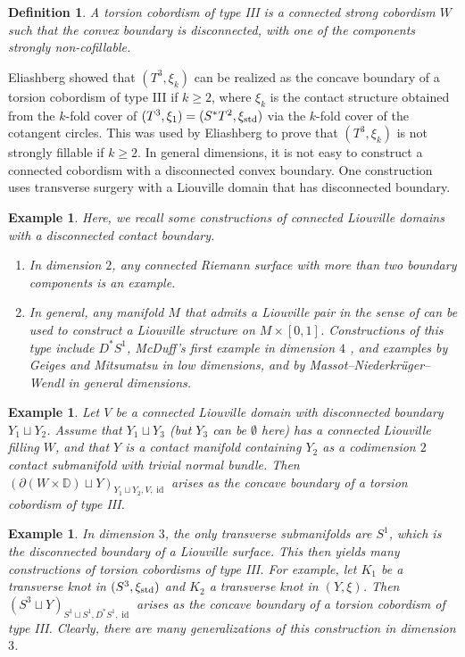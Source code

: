 \documentclass[11pt]{amsart}
\numberwithin{equation}{section}
\newtheorem{definition}[theorem]{\textbf{Definition}}
\newtheorem{example}[theorem]{\textbf{Example}}
\def\D{{\mathbb D}}
\def\std{\rm std}
\DeclareMathOperator{\Id}{id}
\begin{document}
\begin{definition}\label{def:torsion_III}
A torsion cobordism of type III is a \emph{connected} strong cobordism $W$ such that the convex boundary is disconnected, with one of the components strongly non-cofillable.   
\end{definition}
Eliashberg \cite{Eli96} showed that $(T^3,\xi_k)$ can be realized as the concave boundary of a torsion cobordism of type III if $k\ge 2$, where $\xi_k$ is the contact structure obtained from the $k$-fold cover of $(T^3,\xi_1)=(S^*T^2,\xi_{\std})$ via the $k$-fold cover of the cotangent circles. This was used by Eliashberg to prove that $(T^3,\xi_k)$ is not strongly fillable if $k\ge 2$. In general dimensions, it is not easy to construct a connected cobordism with a disconnected convex boundary. One construction uses transverse surgery with a Liouville domain that has disconnected boundary.
\begin{example}
Here, we recall some constructions of connected Liouville domains with a disconnected contact boundary.
\begin{enumerate}
    \item In dimension $2$, any connected Riemann surface with more than two boundary components is an example.
    \item In general, any manifold $M$ that admits a Liouville pair in the sense of \cite[Definition 1]{MNW} can be used to construct a Liouville structure on $M\times [0,1]$. Constructions of this type include $D^*S^1$, McDuff's first example in dimension $4$ \cite{McDuff91}, and examples by Geiges \cite{zbMATH00663659,zbMATH00779041} and Mitsumatsu \cite{zbMATH00842476} in low dimensions, and by Massot--Niederkr\"uger--Wendl \cite{MNW} in general dimensions. 
\end{enumerate}
\end{example}

\begin{example}
Let $V$ be a connected Liouville domain with disconnected boundary $Y_1\sqcup Y_2$. Assume that $Y_1\sqcup Y_3$ (but $Y_3$ can be $\emptyset$ here) has a connected Liouville filling $W$, and that $Y$ is a contact manifold containing $Y_2$ as a codimension $2$ contact submanifold with trivial normal bundle. Then $(\partial(W\times \D)\sqcup Y)_{Y_1\sqcup Y_2,V,\Id}$ arises as the concave boundary of a torsion cobordism of type III. 
\end{example}

\begin{example}
    In dimension $3$, the only transverse submanifolds are $S^1$, which is the disconnected boundary of a Liouville surface. This then yields many constructions of torsion cobordisms of type III. For example,  let $K_1$ be a transverse knot in $(S^3,\xi_{\std})$ and $K_2$ a transverse knot in $(Y,\xi)$. Then $(S^3\sqcup Y)_{S^1\sqcup S^1,D^*S^1,\Id}$ arises as the concave boundary of a torsion cobordism of type III. Clearly, there are many generalizations of this construction in dimension $3$.
\end{example}
\end{document}
